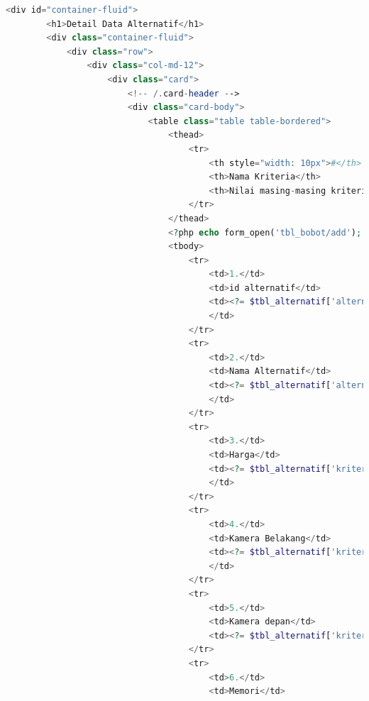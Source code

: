\begin{lstlisting}[language=PHP]
	<div id="container-fluid">  
	    <h1>Detail Data Alternatif</h1>  
	    <div class="container-fluid">  
	        <div class="row">  
	            <div class="col-md-12">  
	                <div class="card">  
	                    <!-- /.card-header -->  
	                    <div class="card-body">  
	                        <table class="table table-bordered">  
	                            <thead>  
	                                <tr>  
	                                    <th style="width: 10px">#</th>  
	                                    <th>Nama Kriteria</th>  
	                                    <th>Nilai masing-masing kriteria</th>  
	                                </tr>  
	                            </thead>  
	                            <?php echo form_open('tbl_bobot/add'); ?>  
	                            <tbody>  
	                                <tr>  
	                                    <td>1.</td>  
	                                    <td>id alternatif</td>  
	                                    <td><?= $tbl_alternatif['alternatif_id']; ?>  
	                                    </td>  
	                                </tr>  
	                                <tr>  
	                                    <td>2.</td>  
	                                    <td>Nama Alternatif</td>  
	                                    <td><?= $tbl_alternatif['alternatif_nama']; ?>  
	                                    </td>  
	                                </tr> 
	                                <tr>  
	                                    <td>3.</td>  
	                                    <td>Harga</td>  
	                                    <td><?= $tbl_alternatif['kriteria_1']; ?> 
	                                    </td>  
	                                </tr> 
	                                <tr>  
	                                    <td>4.</td> 
	                                    <td>Kamera Belakang</td>  
	                                    <td><?= $tbl_alternatif['kriteria_2']; ?>  
	                                    </td>  
	                                </tr>  
	                                <tr>  
	                                    <td>5.</td>  
	                                    <td>Kamera depan</td>  
	                                    <td><?= $tbl_alternatif['kriteria_3']; ?></td>  
	                                </tr>  
	                                <tr>  
	                                    <td>6.</td>  
	                                    <td>Memori</td>  

\end{lstlisting}
